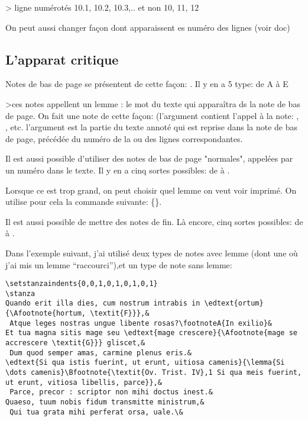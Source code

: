   > ligne numérotés 10.1, 10.2, 10.3,.. et non 10, 11, 12 

On peut aussi changer façon dont apparaissent es numéro des lignes (voir doc)



\subsection{L'apparat critique}

Notes de bas de page se présentent de cette façon:  . Il y en a 5 type: de A à E


>ces notes appellent un lemme : le mot du texte qui apparaîtra ds la  note de bas de page. On fait une note de cette façon:  (l'argument  contient l'appel à la note: , , etc.
l'argument  est la partie du texte annoté qui est reprise dans la note de bas de page, précédée du numéro de la ou des lignes correspondantes. 

Il est aussi possible d'utiliser  des  notes de bas de page "normales", appelées par un numéro dans le texte. Il y en a cinq sortes  possibles: de  à .

Lorsque ce  est trop grand, on peut choisir quel lemme on veut voir imprimé. On utilise pour cela la commande suivante: 
\{\}. 

\begin{plusloins}
Il est aussi possible de mettre des notes de fin. Là encore, cinq sortes possibles:  de  à .
\end{plusloins}

Dans l'exemple suivant, j'ai utilisé deux types de notes avec lemme (dont une où j'ai mis un lemme \enquote{raccourci}),et  un type de note sans lemme:


\begin{verbatim}
\setstanzaindents{0,0,1,0,1,0,1,0,1}
\stanza
Quando erit illa dies, cum nostrum intrabis in \edtext{ortum}{\Afootnote{hortum, \textit{F}}},&
 Atque leges nostras ungue libente rosas?\footnoteA{In exilio}&
Et tua magna sitis mage seu \edtext{mage crescere}{\Afootnote{mage se accrescere \textit{G}}} gliscet,&
 Dum quod semper amas, carmine plenus eris.&
\edtext{Si qua istis fuerint, ut erunt, uitiosa camenis}{\lemma{Si \dots camenis}\Bfootnote{\textit{Ov. Trist. IV},1 Si qua meis fuerint, ut erunt, vitiosa libellis, parce}},&
 Parce, precor : scriptor non mihi doctus inest.&
Quaeso, tuum nobis fidum transmitte ministrum,&
 Qui tua grata mihi perferat orsa, uale.\&
\end{verbatim}

